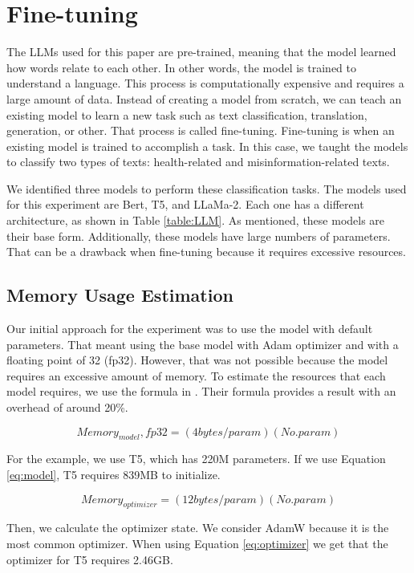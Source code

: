 \section{Fine-tuning}

The LLMs used for this paper are pre-trained, meaning that the model learned how words relate to each other. In other words, the model is trained to understand a language.
This process is computationally expensive and requires a large amount of data. Instead of creating a model from scratch, we can teach an existing model to learn a new task such as text classification, translation, generation, or other. That process is called fine-tuning. Fine-tuning is when an existing model is trained to accomplish a task. In this case, we taught the models to classify two types of texts: health-related and misinformation-related texts. 


We identified three models to perform these classification tasks. The models used for this experiment are Bert, T5, and LLaMa-2. Each one has a different architecture, as shown in Table \ref{table:LLM}. As mentioned, these models are their base form. Additionally, these models have large numbers of parameters. That can be a drawback when fine-tuning because it requires excessive resources. 


\subsection{Memory Usage Estimation}
Our initial approach for the experiment was to use the model with default parameters. That meant using the base model with Adam optimizer and with a floating point of 32 (fp32). However, that was not possible because the model requires an excessive amount of memory. To estimate the resources that each model requires, we use the formula in \cite{transformer-math-eleutherai}. Their formula provides a result with an overhead of around 20\%.


\[ Memory_{model}, fp32 = (4 bytes/param) (No. param) \label{eq:model} \tag{1} \] 

For the example, we use T5, which has 220M parameters. If we use Equation \ref{eq:model}, T5 requires 839MB to initialize.


\[ Memory_{optimizer} = (12 bytes/param) (No. param) \label{eq:optimizer} \tag{2} \] 

Then, we calculate the optimizer state. We consider AdamW because it is the most common optimizer. When using Equation \ref{eq:optimizer} we get that the optimizer for T5 requires 2.46GB.


